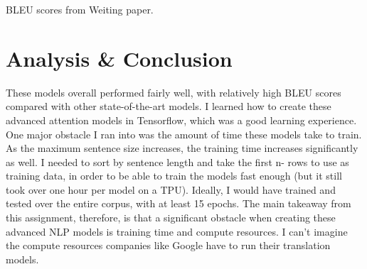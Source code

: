 \documentclass{article}
\begin{document}
BLEU scores from Weiting \cite{wieting2019beyond} paper.

\section{Analysis \& Conclusion}

These models overall performed fairly well, with relatively high BLEU scores compared with other state-of-the-art models. I learned how to create these advanced attention models in Tensorflow, which was a good learning experience. One major obstacle I ran into was the amount of time these models take to train. As the maximum sentence size increases, the training time increases significantly as well. I needed to sort by sentence length and take the first n- rows to use as training data, in order to be able to train the models fast enough (but it still took over one hour per model on a TPU). Ideally, I would have trained and tested over the entire corpus, with at least 15 epochs. The main takeaway from this assignment, therefore, is that a significant obstacle when creating these advanced NLP models is training time and compute resources. I can't imagine the compute resources companies like Google have to run their translation models.

\begin{footnotesize}


\end{footnotesize}
\end{document}
